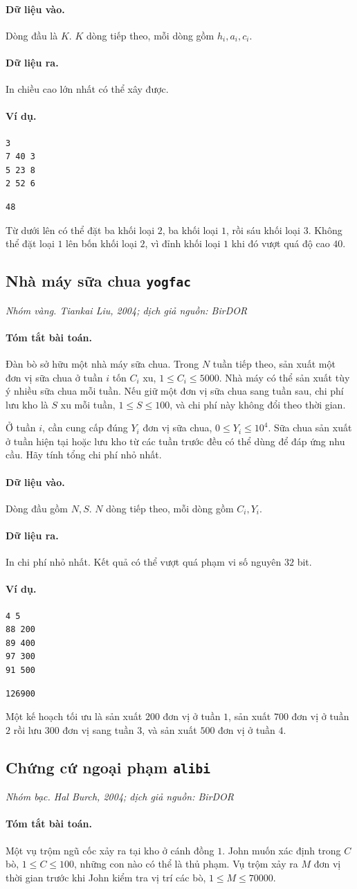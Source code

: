 \documentclass[11pt]{article}
\newcommand{\problem}[4]{%
  \subsection[#1 (#2)]{#1 \hfill {\normalsize\texttt{#2}}}%
  \noindent\textit{#3. #4}\par\smallskip
}
\newcommand{\iosec}[1]{\paragraph{#1}}
\begin{document}
\iosec{Dữ liệu vào.}
Dòng đầu là \(K\). \(K\) dòng tiếp theo, mỗi dòng gồm \(h_i,a_i,c_i\).

\iosec{Dữ liệu ra.}
In chiều cao lớn nhất có thể xây được.

\iosec{Ví dụ.}
\begin{verbatim}
3
7 40 3
5 23 8
2 52 6
\end{verbatim}

\begin{verbatim}
48
\end{verbatim}

Từ dưới lên có thể đặt ba khối loại \(2\), ba khối loại \(1\), rồi sáu khối
loại \(3\). Không thể đặt loại \(1\) lên bốn khối loại \(2\), vì đỉnh khối
loại \(1\) khi đó vượt quá độ cao \(40\).

\problem{Nhà máy sữa chua}{yogfac}{Nhóm vàng}{Tiankai Liu, 2004; dịch giả nguồn: BirDOR}

\iosec{Tóm tắt bài toán.}
Đàn bò sở hữu một nhà máy sữa chua. Trong \(N\) tuần tiếp theo, sản xuất một
đơn vị sữa chua ở tuần \(i\) tốn \(C_i\) xu, \(1\le C_i\le 5000\). Nhà máy có
thể sản xuất tùy ý nhiều sữa chua mỗi tuần. Nếu giữ một đơn vị sữa chua sang
tuần sau, chi phí lưu kho là \(S\) xu mỗi tuần, \(1\le S\le 100\), và chi phí
này không đổi theo thời gian.

Ở tuần \(i\), cần cung cấp đúng \(Y_i\) đơn vị sữa chua,
\(0\le Y_i\le 10^4\). Sữa chua sản xuất ở tuần hiện tại hoặc lưu kho từ các
tuần trước đều có thể dùng để đáp ứng nhu cầu. Hãy tính tổng chi phí nhỏ nhất.

\iosec{Dữ liệu vào.}
Dòng đầu gồm \(N,S\). \(N\) dòng tiếp theo, mỗi dòng gồm \(C_i,Y_i\).

\iosec{Dữ liệu ra.}
In chi phí nhỏ nhất. Kết quả có thể vượt quá phạm vi số nguyên \(32\) bit.

\iosec{Ví dụ.}
\begin{verbatim}
4 5
88 200
89 400
97 300
91 500
\end{verbatim}

\begin{verbatim}
126900
\end{verbatim}

Một kế hoạch tối ưu là sản xuất \(200\) đơn vị ở tuần \(1\), sản xuất \(700\)
đơn vị ở tuần \(2\) rồi lưu \(300\) đơn vị sang tuần \(3\), và sản xuất
\(500\) đơn vị ở tuần \(4\).

\problem{Chứng cứ ngoại phạm}{alibi}{Nhóm bạc}{Hal Burch, 2004; dịch giả nguồn: BirDOR}

\iosec{Tóm tắt bài toán.}
Một vụ trộm ngũ cốc xảy ra tại kho ở cánh đồng \(1\). John muốn xác định trong
\(C\) bò, \(1\le C\le 100\), những con nào có thể là thủ phạm. Vụ trộm xảy ra
\(M\) đơn vị thời gian trước khi John kiểm tra vị trí các bò,
\(1\le M\le 70000\).
\end{document}
